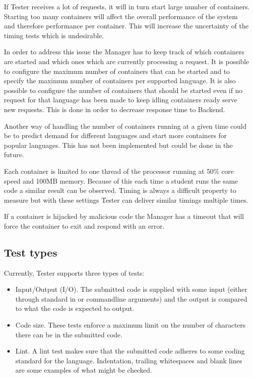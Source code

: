 If Tester receives a lot of requests, it will in turn start large number of containers.
Starting too many containers will affect the overall performance of the system and therefore performance per container.
This will increase the uncertainty of the timing tests which is undesirable.

In order to address this issue the Manager has to keep track of which containers
are started and which ones which are currently processing a request. 
It is possible to configure the maximum number of containers that
can be started and to specify the maximum number of containers
per supported language. It is also possible to configure the number of containers
that should be started even if no request for that language has been made to keep
idling containers ready serve new requests. This is done in order to decrease
response time to Backend.

Another way of handling the number of containers running at a given time could
be to predict demand for different languages and start more containers for popular languages.
This has not been implemented but could be done in the future.

Each container is limited to one thread of the processor running at 50\% core speed and
100MB memory. Because of this each time a student runs the same code a similar
result can be observed. Timing is always a difficult property to measure but with
these settings Tester can deliver similar timings multiple times.

If a container is hijacked by malicious code the Manager has a timeout that will
force the container to exit and respond with an error.

\subsection{Test types}
Currently, Tester supports three types of tests:
\begin{itemize}
\item Input/Output (I/O). The submitted code is supplied with some input (either through standard in or commandline arguments) and the output is compared to what the code is expected to output.
\item Code size. These tests enforce a maximum limit on the number of characters there can be in the submitted code.
\item Lint. A lint test makes sure that the submitted code adheres to some coding standard for the language. Indentation, trailing whitespaces and blank lines are some examples of what might be checked.
\end{itemize}

